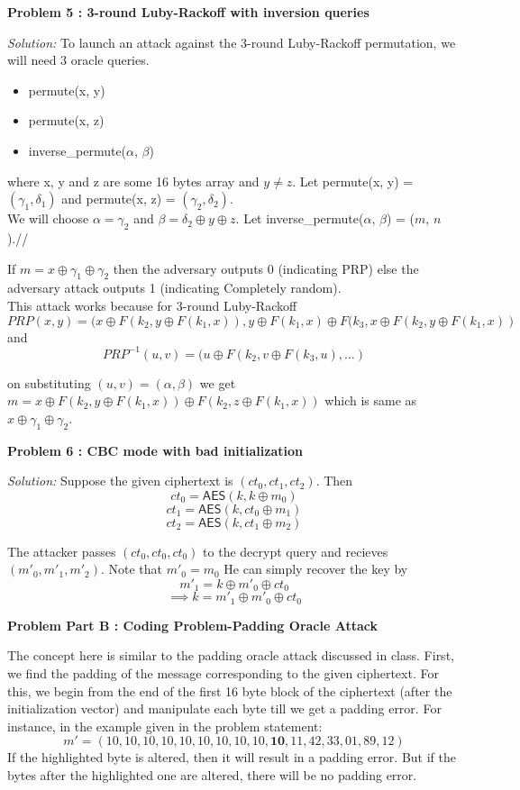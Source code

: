 \documentclass[a4paper, 11pt]{article}
\newenvironment{solution}
    {\textit{Solution:}}
    {\clearpage}
\newcommand{\prob}[1]{\begin{mdframed}[backgroundcolor=gray!20] \textbf{Problem #1}\end{mdframed}}
\newcommand{\AES}{\mathsf{AES}}
\begin{document}
\prob{5 : 3-round Luby-Rackoff with inversion queries}
\begin{solution}
   To launch an attack against the 3-round Luby-Rackoff permutation, we will need 3 oracle queries.
   \begin{itemize}
       \item permute(x, y)
       \item permute(x, z)
       \item inverse\_permute($\alpha$, $\beta$)
   \end{itemize}
   where x, y and z are some 16 bytes array and $y \neq z$. Let permute(x, y) = $(\gamma_1, \delta_1)$ and permute(x, z) = $(\gamma_2, \delta_2)$. \\
   We will choose $\alpha = \gamma_2$ and $\beta = \delta_2 \oplus y \oplus z$. Let inverse\_permute($\alpha$, $\beta$) = ($m$, $n$).//

   If $ m = x \oplus \gamma_1 \oplus \gamma_2$ then the adversary outputs 0 (indicating PRP) else the adversary attack outputs 1 (indicating Completely random).\\

   This attack works because for 3-round Luby-Rackoff $$PRP(x, y) = (x \oplus F(k_2, y \oplus F(k_1, x)), y \oplus F(k_1, x) \oplus F(k_3, x \oplus F(k_2, y \oplus F(k_1, x))$$
   and 
   $$PRP^{-1}(u, v) = (u \oplus F(k_2, v \oplus F(k_3, u), ... )$$

   on substituting $(u, v) = (\alpha, \beta)$ we get $m = x \oplus F(k_2, y \oplus F(k_1, x)) \oplus F(k_2, z \oplus F(k_1, x))$ which is same as $x \oplus \gamma_1 \oplus \gamma_2$.
\end{solution}


\prob{6 : CBC mode with bad initialization}
\begin{solution}
   Suppose the given ciphertext is $(ct_0, ct_1, ct_2)$. Then 
   $$ct_0=\AES(k,k\oplus m_0)$$
   $$ct_1=\AES(k,ct_0\oplus m_1)$$
   $$ct_2=\AES(k,ct_1\oplus m_2)$$
   
   The attacker passes $(ct_0, ct_0, ct_0)$ to the decrypt query and recieves $(m'_0,m'_1,m'_2)$. Note that $m'_0=m_0$ He can simply recover the key by 
   $$m'_1=k\oplus m'_0\oplus ct_0$$
   $$\implies k=m'_1\oplus m'_0\oplus ct_0$$
\end{solution}


\prob{Part B : Coding Problem-Padding Oracle Attack}
The concept here is similar to the padding oracle attack discussed in class. First, we find the padding of the message corresponding to the given ciphertext. For this, we begin from the end of the first 16 byte block of the ciphertext (after the initialization vector) and manipulate each byte till we get a padding error. For instance, in the example given in the problem statement:
$$m' = (10, 10, 10, 10, 10, 10, 10, 10, 10, \mathbf{10}, 11, 42, 33, 01, 89, 12)$$
If the highlighted byte is altered, then it will result in a padding error. But if the bytes after the highlighted one are altered, there will be no padding error.
\end{document}
